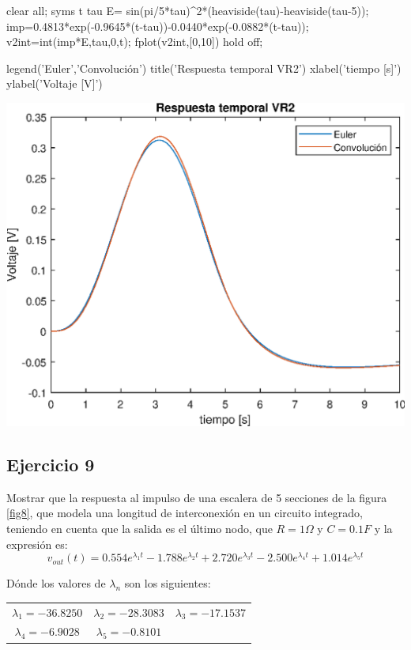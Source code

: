 \documentclass[10pt,a4paper]{article} %
\begin{document}
		\begin{matlabcode}
		clear all;
		syms t tau  
		E= sin(pi/5*tau)^2*(heaviside(tau)-heaviside(tau-5));
		imp=0.4813*exp(-0.9645*(t-tau))-0.0440*exp(-0.0882*(t-tau));
		v2int=int(imp*E,tau,0,t);
		fplot(v2int,[0,10])
		hold off;
		
		legend({'Euler','Convolución'})
		title('Respuesta temporal VR2')
		xlabel('tiempo [s]')
		ylabel('Voltaje [V]')
		\end{matlabcode}
		\begin{center}
		\includegraphics[width=\maxwidth{56.196688409433015em}]{figure_0_08}
		\end{center}
		
	
	\subsection{Ejercicio 9} Mostrar que la respuesta al impulso de una escalera de 5 secciones de la figura \ref{fig8}, que modela una longitud de interconexión en un circuito integrado, teniendo en cuenta que la salida es el último nodo, que $R=1\Omega$ y $C=0.1F$ y la expresión es:
	\begin{equation}
		v_{out}(t)=0.554e^{\lambda_1 t}-1.788e^{\lambda_2 t}+2.720e^{\lambda_3 t}-2.500e^{\lambda_4 t}+1.014e^{\lambda_5 t}
	\end{equation}
	
	Dónde los valores de $\lambda_n$ son los siguientes:
	\begin{center}
		\begin{tabular}{ccc}
			$\lambda_1=-36.8250$ & $\lambda_2=-28.3083$ & $\lambda_3=-17.1537$ \\ 
			$\lambda_4=-6.9028$ & $\lambda_5=-0.8101$ &  \\
		\end{tabular} 
	\end{center}
\end{document}
